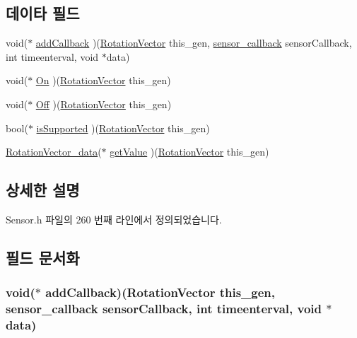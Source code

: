 \subsection*{데이타 필드}
\begin{DoxyCompactItemize}
\item 
void($\ast$ \hyperlink{struct___rotation_vector_ad472cb3e9a46a2c39e0e816eefedb549}{add\-Callback} )(\hyperlink{_sensor_8h_a9b05582479731d0c51a02be87c1f6b4a}{Rotation\-Vector} this\-\_\-gen, \hyperlink{_sensor_8h_ad8114207845fc5e0aa30832f0c718cd6}{sensor\-\_\-callback} sensor\-Callback, int timeenterval, void $\ast$data)
\item 
void($\ast$ \hyperlink{struct___rotation_vector_a4b696cbf05ce516ce608cb1ac70dbcc3}{On} )(\hyperlink{_sensor_8h_a9b05582479731d0c51a02be87c1f6b4a}{Rotation\-Vector} this\-\_\-gen)
\item 
void($\ast$ \hyperlink{struct___rotation_vector_ab4af77a4f32af8d4001b111cb630c1e6}{Off} )(\hyperlink{_sensor_8h_a9b05582479731d0c51a02be87c1f6b4a}{Rotation\-Vector} this\-\_\-gen)
\item 
bool($\ast$ \hyperlink{struct___rotation_vector_a6064cf9c8ed8eeb39afea3993119d471}{is\-Supported} )(\hyperlink{_sensor_8h_a9b05582479731d0c51a02be87c1f6b4a}{Rotation\-Vector} this\-\_\-gen)
\item 
\hyperlink{_sensor_8h_a544a9cbbdfd547167181ebc171137ad6}{Rotation\-Vector\-\_\-data}($\ast$ \hyperlink{struct___rotation_vector_ac37bd4354c04172e326f5c6f86580785}{get\-Value} )(\hyperlink{_sensor_8h_a9b05582479731d0c51a02be87c1f6b4a}{Rotation\-Vector} this\-\_\-gen)
\end{DoxyCompactItemize}


\subsection{상세한 설명}


Sensor.\-h 파일의 260 번째 라인에서 정의되었습니다.



\subsection{필드 문서화}
\hypertarget{struct___rotation_vector_ad472cb3e9a46a2c39e0e816eefedb549}{
\subsubsection[{add\-Callback}]{\setlength{\rightskip}{0pt plus 5cm}void($\ast$  add\-Callback)({\bf Rotation\-Vector} this\-\_\-gen, {\bf sensor\-\_\-callback} sensor\-Callback, int timeenterval, void $\ast$data)}}\label{struct___rotation_vector_ad472cb3e9a46a2c39e0e816eefedb549}


